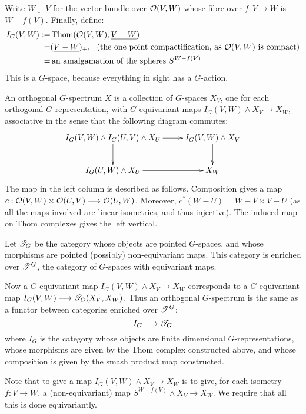 \documentclass[11pt]{article}
\begin{document}
\begin{FourthWeek}
Write $\underline{W-V}$ for the vector bundle over $\mathcal{O}(V,W)$ whose fibre over $f:V\to W$ is $W-f(V)$. Finally, define:
\begin{alignat*}{2}
I_G(V,W):=&\textup{\,Thom}(\mathcal{O}(V,W),\underline{V-W})\\
=&(\underline{V-W})_+,\text{ \ (the one point compactification, as $\mathcal{O}(V,W)$ is compact)}\\
=&\text{\,an amalgamation of the spheres $S^{W-f(V)}$}
\end{alignat*}
This is a $G$-space, because everything in sight has a $G$-action.
\begin{defn*}
An orthogonal $G$-spectrum $X$ is a collection of $G$-spaces $X_V$, one for each orthogonal $G$-representation, with $G$-equivariant maps $I_G(V,W)\wedge X_V\to X_W$, associative in the sense that the following diagram commutes:
\[\xymatrix{
\ar[d]I_G(V,W)\wedge I_G(U,V)\wedge X_U\ar[r]&I_G(V,W)\wedge X_{V}\ar[d]\\
I_G(U,W)\wedge X_U\ar[r]&X_{W}
}\]
The map in the left column is described as follows. Composition gives a map $c:\mathcal{O}(V,W)\times\mathcal{O}(U,V)\longrightarrow\mathcal{O}(U,W)$. Moreover, $c^*(\underline{W-U})=\underline{W-V}\times\underline{V-U}$ (as all the maps involved are linear isometries, and thus injective). The induced map on Thom complexes gives the left vertical.
\end{defn*}

Let $\mathscr{T}_G$ be the category whose objects are pointed $G$-spaces, and whose morphisms are pointed (possibly) non-equivariant maps. This category is enriched over $\mathscr{T}^G$, the category of $G$-spaces with equivariant maps.

Now a $G$-equivariant map $I_G(V,W)\wedge X_V\to X_W$ corresponds to a $G$-equivariant map $I_G(V,W)\longrightarrow \mathscr{T}_G(X_V,X_W)$. Thus an orthogonal $G$-spectrum is the same as a functor between categories enriched over $\mathscr{T}^G$:
\[I_G\longrightarrow\mathscr{T}_G\]
where $I_G$ is the category whose objects are finite dimensional $G$-representations, whose morphisms are given by the Thom complex constructed above, and whose composition is given by the smash product map constructed.

Note that to give a map $I_G(V,W)\wedge X_V\to X_W$ is to give, for each isometry $f:V\to W$, a (non-equivariant) map $S^{W-f(V)}\wedge X_V\to X_W$. We require that all this is done equivariantly.


\end{FourthWeek}
\end{document}
